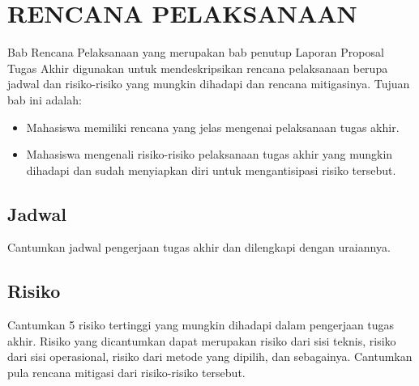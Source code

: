 \chapter{RENCANA PELAKSANAAN}
\label{chap:rencana}
\begin{petunjuk}
Bab Rencana Pelaksanaan yang merupakan bab penutup Laporan Proposal Tugas Akhir digunakan untuk mendeskripsikan rencana pelaksanaan berupa jadwal dan risiko-risiko yang mungkin dihadapi dan rencana mitigasinya. Tujuan bab ini adalah:
\begin{itemize}
  \item Mahasiswa memiliki rencana yang jelas mengenai pelaksanaan tugas akhir.
  \item Mahasiswa mengenali risiko-risiko pelaksanaan tugas akhir yang mungkin dihadapi dan sudah menyiapkan diri untuk mengantisipasi risiko tersebut.
\end{itemize}
\end{petunjuk}

\section{Jadwal}
\begin{petunjuk}
Cantumkan jadwal pengerjaan tugas akhir dan dilengkapi dengan uraiannya.
\end{petunjuk}

\section{Risiko}
\begin{petunjuk}
Cantumkan 5 risiko tertinggi yang mungkin dihadapi dalam pengerjaan tugas akhir. Risiko yang dicantumkan dapat merupakan risiko dari sisi teknis, risiko dari sisi operasional, risiko dari metode yang dipilih, dan sebagainya. Cantumkan pula rencana mitigasi dari risiko-risiko tersebut.
\end{petunjuk}

